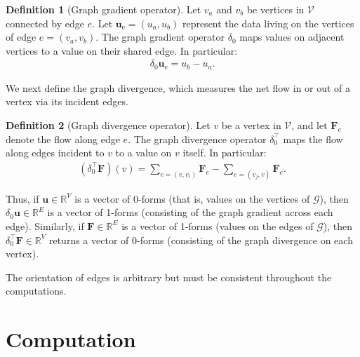 \documentclass{article}
\theoremstyle{definition}
\newtheorem{definition}{Definition}%
\theoremstyle{remark}
\begin{document}
\begin{definition}[Graph gradient operator]
    Let $v_a$ and $v_b$ be vertices in $\mathcal{V}$ connected by edge $e$. Let $\mathbf{u}_\text{e}=(u_a,u_b)$ represent the data living on the vertices of edge $e=(v_a,v_b)$. The graph gradient operator $\delta_0$ maps values on adjacent vertices to a value on their shared edge. In particular:
    \begin{align}
        \delta_0\mathbf{u}_\text{e}=u_b-u_a.
    \end{align} 
    \end{definition}

We next define the graph divergence, which measures the net flow in or out of a vertex via its incident edges.

\begin{definition}[Graph divergence operator]
    Let $v$ be a vertex in $\mathcal{V}$, and let $\mathbf{F}_e$ denote the flow along edge $e$. The graph divergence operator $\delta_0^\intercal$ maps the flow along edges incident to $v$ to a value on $v$ itself. In particular: 
    \begin{align}
    (\delta_0^\intercal \mathbf{F})(v)=\sum_{e=(v,v_i)}\mathbf{F}_e-\sum_{e=(v_j,v)}\mathbf{F}_e.
    \end{align}
\end{definition}

Thus, if $\mathbf{u}\in\mathbb{R}^{V}$ is a vector of 0-forms (that is, values on the vertices of $\mathcal{G}$), then $\delta_0\mathbf{u}\in\mathbb{R}^{E}$ is a vector of 1-forms (consisting of the graph gradient across each edge). Similarly, if $\mathbf{F}\in\mathbb{R}^{E}$ is a vector of 1-forms (values on the edges of $\mathcal{G}$), then $\delta_0^\intercal\mathbf{F}\in\mathbb{R}^{V}$ returns a vector of 0-forms (consisting of the graph divergence on each vertex).


The orientation of edges is arbitrary but must be consistent throughout the computations.


\section{Computation}\label{sec:formulation}
\end{document}
